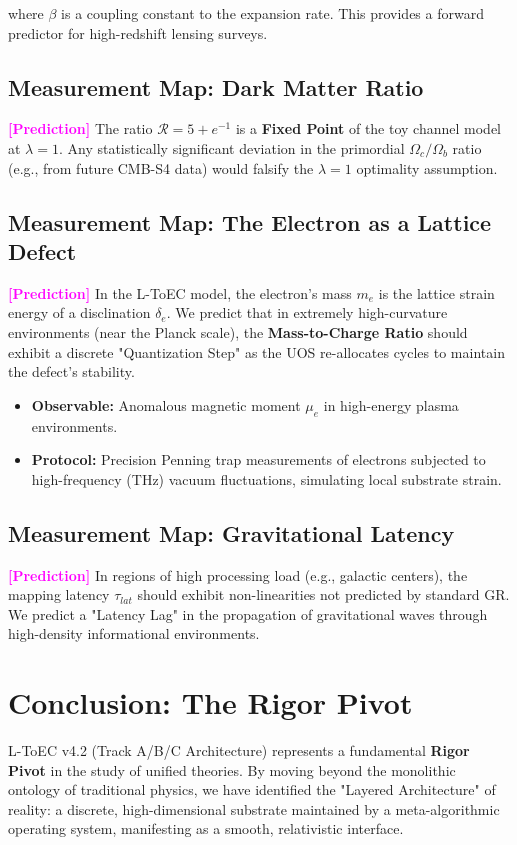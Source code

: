 \documentclass[11pt,titlepage]{article}
\newcommand{\tagpred}{\textcolor{magenta}{\textbf{[Prediction]}} }
\begin{document}
where $\beta$ is a coupling constant to the expansion rate. This provides a forward predictor for high-redshift lensing surveys.

\subsection{Measurement Map: Dark Matter Ratio}
\tagpred The ratio $\mathcal{R} = 5 + e^{-1}$ is a \textbf{Fixed Point} of the toy channel model at $\lambda=1$. Any statistically significant deviation in the primordial $\Omega_c/\Omega_b$ ratio (e.g., from future CMB-S4 data) would falsify the $\lambda=1$ optimality assumption.


\subsection{Measurement Map: The Electron as a Lattice Defect}
\tagpred In the L-ToEC model, the electron's mass $m_e$ is the lattice strain energy of a disclination $\delta_e$. We predict that in extremely high-curvature environments (near the Planck scale), the \textbf{Mass-to-Charge Ratio} should exhibit a discrete "Quantization Step" as the UOS re-allocates cycles to maintain the defect's stability.
\begin{itemize}
    
\item \textbf{Observable:} Anomalous magnetic moment $\mu_e$ in high-energy plasma environments.
    
\item \textbf{Protocol:} Precision Penning trap measurements of electrons subjected to high-frequency (THz) vacuum fluctuations, simulating local substrate strain.
\end{itemize}

\subsection{Measurement Map: Gravitational Latency}
\tagpred In regions of high processing load (e.g., galactic centers), the mapping latency $\tau_{lat}$ should exhibit non-linearities not predicted by standard GR. We predict a "Latency Lag" in the propagation of gravitational waves through high-density informational environments.

\section{Conclusion: The Rigor Pivot}
L-ToEC v4.2 (Track A/B/C Architecture) represents a fundamental \textbf{Rigor Pivot} in the study of unified theories. By moving beyond the monolithic ontology of traditional physics, we have identified the "Layered Architecture" of reality: a discrete, high-dimensional substrate maintained by a meta-algorithmic operating system, manifesting as a smooth, relativistic interface.
\end{document}
